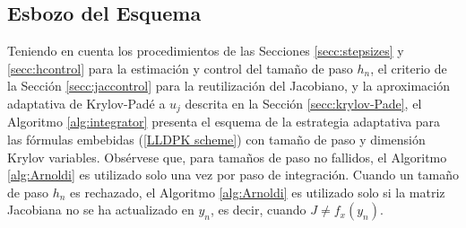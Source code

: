\subsection{Esbozo del Esquema}

Teniendo en cuenta los procedimientos de las Secciones \ref{secc:stepsizes} y \ref{secc:hcontrol} para la estimación y control del tamaño de paso $h_n$, el criterio de la Sección \ref{secc:jaccontrol} para la reutilización del Jacobiano, y la aproximación adaptativa de Krylov-Padé a $u_j$ descrita en la Sección \ref{secc:krylov-Pade}, el Algoritmo \ref{alg:integrator} presenta el esquema de la estrategia adaptativa para las fórmulas embebidas  (\ref{LLDPK scheme}) con tamaño de paso y dimensión Krylov variables. Obsérvese que, para tamaños de paso no fallidos, el Algoritmo \ref{alg:Arnoldi} es utilizado solo una vez por paso de integración. Cuando un tamaño de paso $h_n$ es rechazado, el Algoritmo \ref{alg:Arnoldi} es utilizado solo si la matriz Jacobiana no se ha actualizado en $y_n$, es decir, cuando $J \neq f_x(y_n)$.



